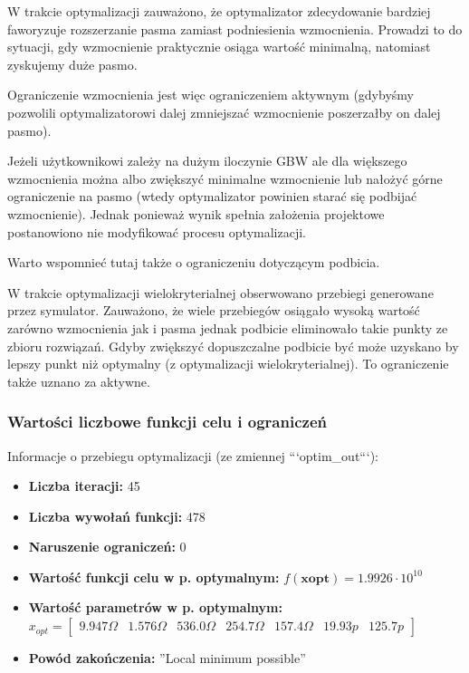 \documentclass{article}
\begin{document}
W trakcie optymalizacji zauważono, że optymalizator zdecydowanie bardziej faworyzuje rozszerzanie pasma zamiast podniesienia wzmocnienia.
Prowadzi to do sytuacji, gdy wzmocnienie praktycznie osiąga wartość minimalną, natomiast zyskujemy duże pasmo.

Ograniczenie wzmocnienia jest więc ograniczeniem aktywnym (gdybyśmy pozwolili optymalizatorowi dalej zmniejszać wzmocnienie poszerzałby on dalej pasmo).

Jeżeli użytkownikowi zależy na dużym iloczynie GBW ale dla większego wzmocnienia można albo zwiększyć minimalne wzmocnienie lub nałożyć górne ograniczenie na pasmo (wtedy optymalizator
powinien starać się podbijać wzmocnienie). Jednak ponieważ wynik spełnia założenia projektowe postanowiono nie modyfikować procesu optymalizacji.

Warto wspomnieć tutaj także o ograniczeniu dotyczącym podbicia.

W trakcie optymalizacji wielokryterialnej obserwowano przebiegi generowane przez symulator. Zauważono, że wiele przebiegów osiągało wysoką wartość zarówno wzmocnienia jak i pasma
jednak podbicie eliminowało takie punkty ze zbioru rozwiązań. Gdyby zwiększyć dopuszczalne podbicie być może uzyskano by lepszy punkt niż optymalny (z optymalizacji wielokryterialnej). To ograniczenie
także uznano za aktywne.
\subsubsection*{Wartości liczbowe funkcji celu i ograniczeń}
Informacje o przebiegu optymalizacji (ze zmiennej ```optim\_out```):
\begin{itemize}
    \item \textbf{Liczba iteracji:} 45
    \item \textbf{Liczba wywołań funkcji:} 478
    \item \textbf{Naruszenie ograniczeń:} 0
    \item \textbf{Wartość funkcji celu w p. optymalnym:} $f(\textbf{xopt})=1.9926\cdot 10^{10}$
    \item \textbf{Wartość parametrów w p. optymalnym:} \\ $ x_{opt}= \begin{bmatrix}     9.947 \Omega & 1.576 \Omega & 536.0 \Omega & 254.7 \Omega & 157.4 \Omega & 19.93 p & 125.7 p       \end{bmatrix}  $
    \item \textbf{Powód zakończenia:} ''Local minimum possible''
\end{itemize}
\end{document}
